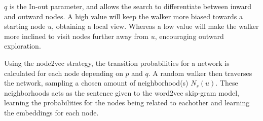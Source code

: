 $q$ is the In-out parameter, and allows the search to differentiate between inward and outward nodes. A high value will keep the walker more biased towards a starting node $u$, obtaining a local view. Whereas a low value will make the walker more inclined to visit nodes further away from $u$, encouraging outward exploration.

Using the node2vec strategy, the transition probabilities for a network is calculated for each node depending on $p$ and $q$. A random walker then traverses the network, sampling a chosen amount of neighborhood(s) $N_s(u)$. These neighborhoods acts as the sentence given to the word2vec skip-gram model, learning the probabilities for the nodes being related to eachother and learning the embeddings for each node.
